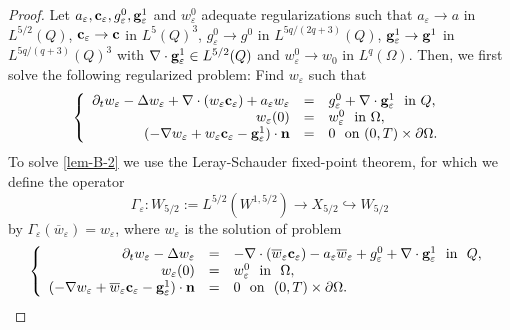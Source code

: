 \documentclass[11pt,reqno]{amsart}%
\numberwithin{equation}{section}
\begin{document}
{ \begin{proof} %
 Let $a_{\varepsilon},{\bf c}_\varepsilon, g^0_\varepsilon, {\bf g}_\varepsilon^1$ and $w^0_\varepsilon$ adequate regularizations such that 
 $a_{\varepsilon}\to a$ in $L^{5/2}(Q)$, $ {\bf c}_\varepsilon\to {\bf c}$ in $L^5(Q)^3$, $g^0_\varepsilon\to g^0$ in $L^{5q/(2q+3)}(Q)$, 
 ${\bf g}_\varepsilon^1\to {\bf g}^1$ in $L^{5q/(q+3)}(Q)^3$ with $\nabla\cdot{\bf g}^1_\varepsilon\in L^{5/2}(Q)$ %
  and $w_\varepsilon^0\to w_0$ in $L^{q}(\Omega)$. Then, we first solve the following regularized problem: Find $w_\varepsilon$ such that
 \begin{equation}\label{lem-B-2}
 \left\{
 \begin{array}{rcl}
 \partial_tw_\varepsilon-\Delta w_\varepsilon+\nabla\cdot(w_\varepsilon{\bf c}_\varepsilon)+a_{\varepsilon} w_\varepsilon&=&g^0_\varepsilon+\nabla\cdot{\bf g}^1_\varepsilon\ \mbox{ in $Q$},\\
 w_\varepsilon(0)&=&w_\varepsilon^0\ \mbox{ in $\Omega$},\\
 (-\nabla w_\varepsilon+w_\varepsilon{\bf c}_\varepsilon-{\bf g}_\varepsilon^1)\cdot{\bf n}&=&0\ \mbox{ on $(0,T)\times\partial\Omega$}.
 \end{array}
 \right.
 \end{equation}
 To solve \eqref{lem-B-2} we use the Leray-Schauder fixed-point theorem, for which we define the operator 
 $$
 \Gamma_\varepsilon: W_{5/2}:= L^{5/2}(W^{1,5/2})\to X_{5/2}\hookrightarrow W_{5/2}
 $$
 by $\Gamma_\varepsilon(\overline{w}_\varepsilon)=w_\varepsilon$, where $w_\varepsilon$ is the solution of problem 
 \begin{equation}\label{lem-B-3}
 \left\{
 \begin{array}{rcl}
 \partial_tw_\varepsilon-\Delta w_\varepsilon&=&-\nabla\cdot(\overline{w}_\varepsilon{\bf c}_\varepsilon)-a_{\varepsilon} \overline{w}_\varepsilon +g^0_\varepsilon+\nabla\cdot{\bf g}^1_\varepsilon\ \mbox{ in }\ Q,\\
 w_\varepsilon(0)&=&w_\varepsilon^0\ \mbox{ in }\ \Omega,\\
 (-\nabla w_\varepsilon+\overline w_\varepsilon{\bf c}_\varepsilon-{\bf g}_\varepsilon^1)\cdot{\bf n}&=&0\ \mbox{ on }\ (0,T)\times\partial\Omega.
 \end{array}
 \right.
 \end{equation}

\end{proof}}
\end{document}
